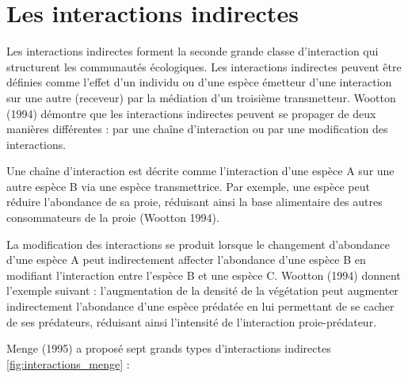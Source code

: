 \documentclass[
  12pt,
  a4paper,
  oneside]{report}
\begin{document}
\hypertarget{les-interactions-indirectes}{%
\section{Les interactions
indirectes}\label{les-interactions-indirectes}}

Les interactions indirectes forment la seconde grande classe
d'interaction qui structurent les communautés écologiques. Les
interactions indirectes peuvent être définies comme l'effet d'un
individu ou d'une espèce émetteur d'une interaction sur une autre
(receveur) par la médiation d'un troisième transmetteur. Wootton (1994)
démontre que les interactions indirectes peuvent se propager de deux
manières différentes : par une chaîne d'interaction ou par une
modification des interactions.

Une chaîne d'interaction est décrite comme l'interaction d'une espèce A
sur une autre espèce B via une espèce transmettrice. Par exemple, une
espèce peut réduire l'abondance de sa proie, réduisant ainsi la base
alimentaire des autres consommateurs de la proie (Wootton 1994).

La modification des interactions se produit lorsque le changement
d'abondance d'une espèce A peut indirectement affecter l'abondance d'une
espèce B en modifiant l'interaction entre l'espèce B et une espèce C.
Wootton (1994) donnent l'exemple suivant : l'augmentation de la densité
de la végétation peut augmenter indirectement l'abondance d'une espèce
prédatée en lui permettant de se cacher de ses prédateurs, réduisant
ainsi l'intensité de l'interaction proie-prédateur.

Menge (1995) a proposé sept grands types d'interactions indirectes
\cref{fig:interactions_menge} :
\end{document}
